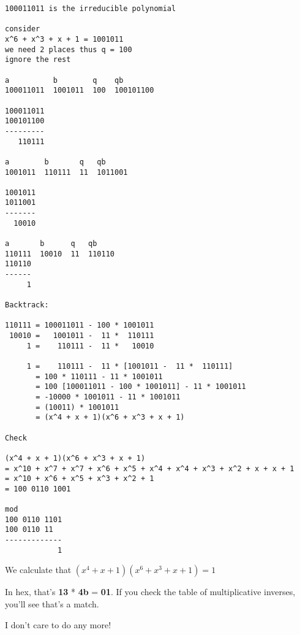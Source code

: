 \documentclass[11pt, oneside]{article}
\begin{document}
\begin{verbatim}
100011011 is the irreducible polynomial

consider 
x^6 + x^3 + x + 1 = 1001011
we need 2 places thus q = 100
ignore the rest

a          b        q    qb
100011011  1001011  100  100101100
 
100011011
100101100
---------
   110111

a        b       q   qb
1001011  110111  11  1011001

1001011
1011001
-------
  10010

a       b      q   qb
110111  10010  11  110110
110110
------
     1

Backtrack:

110111 = 100011011 - 100 * 1001011
 10010 =   1001011 -  11 *  110111
     1 =    110111 -  11 *   10010

     1 =    110111 -  11 * [1001011 -  11 *  110111]
       = 100 * 110111 - 11 * 1001011
       = 100 [100011011 - 100 * 1001011] - 11 * 1001011
       = -10000 * 1001011 - 11 * 1001011
       = (10011) * 1001011
       = (x^4 + x + 1)(x^6 + x^3 + x + 1)

Check

(x^4 + x + 1)(x^6 + x^3 + x + 1)
= x^10 + x^7 + x^7 + x^6 + x^5 + x^4 + x^4 + x^3 + x^2 + x + x + 1
= x^10 + x^6 + x^5 + x^3 + x^2 + 1
= 100 0110 1001

mod
100 0110 1101
100 0110 11
-------------
            1
\end{verbatim}
            
We calculate that $(x^4 + x + 1)(x^6 + x^3 + x + 1) = 1$

In hex, that's \textbf{13} * \textbf{4b} = \textbf{01}.  If you check the table of multiplicative inverses, you'll see that's a match.

I don't care to do any more!
\end{document}
